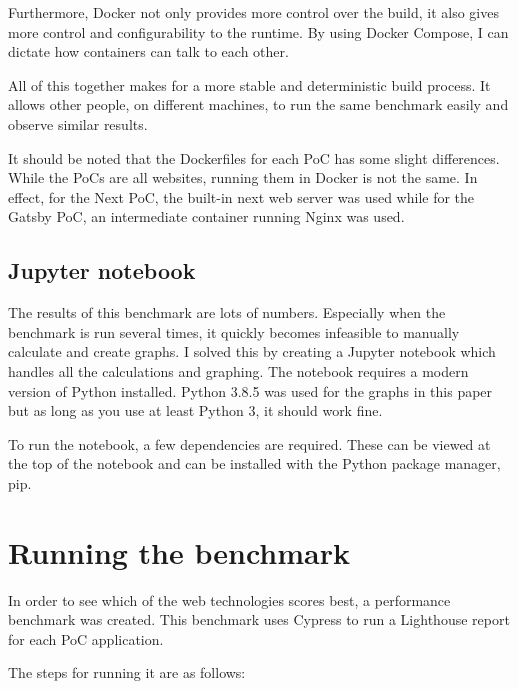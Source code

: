 Furthermore, Docker not only provides more control over the build, it also gives more control and configurability to the runtime. 
By using Docker Compose, I can dictate how containers can talk to each other.

All of this together makes for a more stable and deterministic build process. 
It allows other people, on different machines, to run the same benchmark easily and observe similar results.

It should be noted that the Dockerfiles for each PoC has some slight differences.
While the PoCs are all websites, running them in Docker is not the same. 
In effect, for the Next PoC, the built-in next web server was used while for the Gatsby PoC, an intermediate container running Nginx was used.

\subsection{Jupyter notebook}

The results of this benchmark are lots of numbers. 
Especially when the benchmark is run several times, it quickly becomes infeasible to manually calculate and create graphs.
I solved this by creating a Jupyter notebook which handles all the calculations and graphing. 
The notebook requires a modern version of Python installed. 
Python 3.8.5 was used for the graphs in this paper but as long as you use at least Python 3, it should work fine.

To run the notebook, a few dependencies are required. 
These can be viewed at the top of the notebook and can be installed with the Python package manager, pip. 


\section{Running the benchmark}

In order to see which of the web technologies scores best, a performance benchmark was created. 
This benchmark uses Cypress to run a Lighthouse report for each PoC application.

The steps for running it are as follows:

